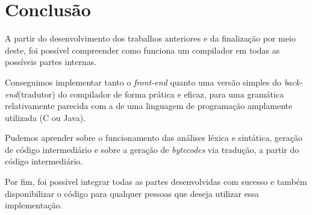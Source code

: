 \section{Conclusão}

A partir do desenvolvimento dos trabalhos anteriores e da finalização por meio deste, foi possível compreender como funciona um compilador em todas as possíveis partes internas.

Conseguimos implementar tanto o \textit{front-end} \cite{aho2007compilers} quanto uma versão simples do \textit{back-end}(tradutor) do compilador de forma prática e eficaz, para uma gramática relativamente parecida com a de uma linguagem de programação amplamente utilizada (C ou Java).

Pudemos aprender sobre o funcionamento das análises léxica e sintática, geração de código intermediário e sobre a geração de \textit{bytecodes} via tradução, a partir do código intermediário.

Por fim, foi possível integrar todas as partes desenvolvidas com sucesso e também disponibilizar o código para qualquer pessoas que deseja utilizar essa implementação.